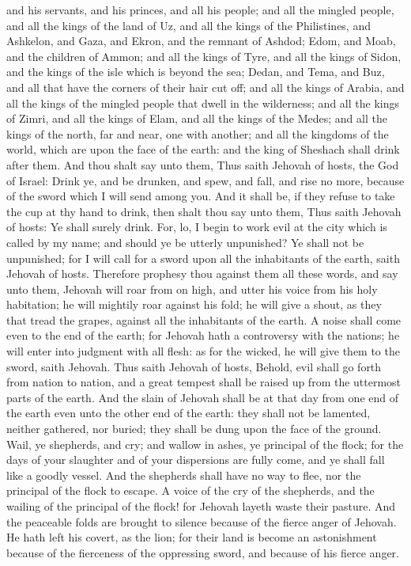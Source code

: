 and his servants, and his princes, and all his people; and all the mingled people, and all the kings of the land of Uz, and all the kings of the Philistines, and Ashkelon, and Gaza, and Ekron, and the remnant of Ashdod; Edom, and Moab, and the children of Ammon; and all the kings of Tyre, and all the kings of Sidon, and the kings of the isle which is beyond the sea; Dedan, and Tema, and Buz, and all that have the corners of their hair cut off; and all the kings of Arabia, and all the kings of the mingled people that dwell in the wilderness; and all the kings of Zimri, and all the kings of Elam, and all the kings of the Medes; and all the kings of the north, far and near, one with another; and all the kingdoms of the world, which are upon the face of the earth: and the king of Sheshach shall drink after them.  And thou shalt say unto them, Thus saith Jehovah of hosts, the God of Israel: Drink ye, and be drunken, and spew, and fall, and rise no more, because of the sword which I will send among you. And it shall be, if they refuse to take the cup at thy hand to drink, then shalt thou say unto them, Thus saith Jehovah of hosts: Ye shall surely drink. For, lo, I begin to work evil at the city which is called by my name; and should ye be utterly unpunished? Ye shall not be unpunished; for I will call for a sword upon all the inhabitants of the earth, saith Jehovah of hosts.  Therefore prophesy thou against them all these words, and say unto them, Jehovah will roar from on high, and utter his voice from his holy habitation; he will mightily roar against his fold; he will give a shout, as they that tread the grapes, against all the inhabitants of the earth. A noise shall come even to the end of the earth; for Jehovah hath a controversy with the nations; he will enter into judgment with all flesh: as for the wicked, he will give them to the sword, saith Jehovah.  Thus saith Jehovah of hosts, Behold, evil shall go forth from nation to nation, and a great tempest shall be raised up from the uttermost parts of the earth. And the slain of Jehovah shall be at that day from one end of the earth even unto the other end of the earth: they shall not be lamented, neither gathered, nor buried; they shall be dung upon the face of the ground. Wail, ye shepherds, and cry; and wallow in ashes, ye principal of the flock; for the days of your slaughter and of your dispersions are fully come, and ye shall fall like a goodly vessel. And the shepherds shall have no way to flee, nor the principal of the flock to escape. A voice of the cry of the shepherds, and the wailing of the principal of the flock! for Jehovah layeth waste their pasture. And the peaceable folds are brought to silence because of the fierce anger of Jehovah. He hath left his covert, as the lion; for their land is become an astonishment because of the fierceness of the oppressing sword, and because of his fierce anger. 


